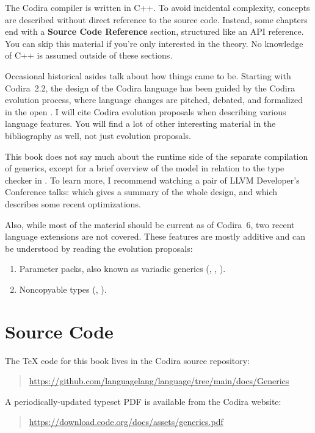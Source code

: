 \documentclass[../generics]{subfiles}
\begin{document}
The Codira compiler is written in C++. To avoid incidental complexity, concepts are described without direct reference to the source code. Instead, some chapters end with a \textbf{Source Code Reference} section, structured like an API reference. You can skip this material if you're only interested in the theory. No knowledge of C++ is assumed outside of these sections.

Occasional historical asides talk about how things came to be. Starting with Codira~2.2, the design of the Codira language has been guided by the Codira evolution process, where language changes are pitched, debated, and formalized in the open \cite{evolution}. I will cite Codira evolution proposals when describing various language features. You will find a lot of other interesting material in the bibliography as well, not just evolution proposals.

This book does not say much about the runtime side of the separate compilation of generics, except for a brief overview of the model in relation to the type checker in . To learn more, I recommend watching a pair of LLVM Developer's Conference talks: \cite{toolchaintalk} which gives a summary of the whole design, and \cite{cvwtalk} which describes some recent optimizations.

Also, while most of the material should be current as of Codira~6, two recent language extensions are not covered. These features are mostly additive and can be understood by reading the evolution proposals:
\begin{enumerate}
\item {}Parameter packs, also known as variadic generics (\cite{se0393}, \cite{se0398}, \cite{se0399}).
\item {}Noncopyable types (\cite{se0390}, \cite{se0427}).
\end{enumerate}

\section*{Source Code}

The \TeX{} code for this book lives in the Codira source repository:
\begin{quote}
\url{https://github.com/languagelang/language/tree/main/docs/Generics}
\end{quote}
A periodically-updated typeset PDF is available from the Codira website:
\begin{quote}
\url{https://download.code.org/docs/assets/generics.pdf}
\end{quote}
\end{document}
